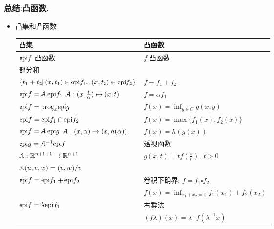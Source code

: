 \documentclass[handout,10pt]{beamer}
\begin{document}
\begin{frame}
\frametitle{总结:凸函数.}
\begin{itemize}
\item 凸集和凸函数

\medskip
\begin{footnotesize}
\begin{tabular}{ll}
	\toprule
	凸集 & 凸函数 \\
	\midrule
	$\textnormal{epi}f $ 凸函数 & $f$ 凸函数 \\  \midrule
	部分和 & \\
	\footnotesize{ $\left\{t_1+t_2 |\, (x,t_1) \in \epi f_1, \ (x,t_2)\in \epi f_2\right\}$ }  &     $f = f_1 + f_2$ \\  \midrule
	$\textnormal{epi} f = \mathcal{A} \,\textnormal{epi} f_1$ $\mathcal{A}: (x,\frac{t}{\alpha}) \mapsto (x,t)$   &     $f = \alpha f_1$ \\ \midrule
	$\textnormal{epi} f = \textnormal{prog}_x \textnormal{epi} g$   & $f(x) = \inf_{y\in C} g(x,y)$\\ \midrule
	$\textnormal{epi} f =  \textnormal{epi} f_1 \cap \textnormal{epi} f_2$   & $f(x) =  \max\{f_1(x),f_2(x)\}$\\ \midrule
	$\textnormal{epi} f = \mathcal{A}\, \textnormal{epi} g $ $\mathcal{A}: (x, {\alpha}) \mapsto (x,h(\alpha))$  &       $ f(x)  = h(g(x))$ \\

$\textnormal{epi} g = \mathcal{A}^{-1} \textnormal{epi} f$  & 透视函数 \\
		$\mathcal{A}:  \mathbb{R}^{n+1+1} \rightarrow \mathbb{R}^{n+1}$  &  \quad $g(x,t) = t   f(\frac{x}{t}), \ t>0$    \\
		$\mathcal{A}(u,v,w) = (u,w)/v   $    & \\ \midrule
		\multirow{2}{*}{ $\textnormal{epi} f =  \textnormal{epi} f_1 + \textnormal{epi} f_2$ }  & 卷积下确界: $f = f_1 \square  f_2 $ \\
		& \quad $f(x) = \inf_{x_1 + x_2 = x}  f_1(x_1) +f_2(x_2)  $ \\ \midrule
		\multirow{2}{*}{ $\textnormal{epi} f =  \lambda \textnormal{epi} f_1  $ }   & 右乘法 \\
		& $(f\lambda)(x) =  \lambda\cdot f(\lambda^{-1}x)$   \\

	\bottomrule
\end{tabular}
\end{footnotesize}

\end{itemize}
\end{frame}
\end{document}
